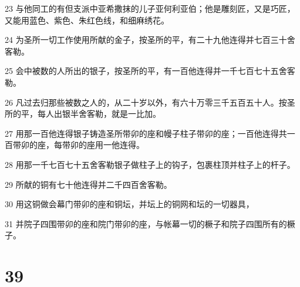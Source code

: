 \par 23 与他同工的有但支派中亚希撒抹的儿子亚何利亚伯；他是雕刻匠，又是巧匠，又能用蓝色、紫色、朱红色线，和细麻绣花。
\par 24 为圣所一切工作使用所献的金子，按圣所的平，有二十九他连得并七百三十舍客勒。
\par 25 会中被数的人所出的银子，按圣所的平，有一百他连得并一千七百七十五舍客勒。
\par 26 凡过去归那些被数之人的，从二十岁以外，有六十万零三千五百五十人。按圣所的平，每人出银半舍客勒，就是一比加。
\par 27 用那一百他连得银子铸造圣所带卯的座和幔子柱子带卯的座；一百他连得共一百带卯的座，每带卯的座用一他连得。
\par 28 用那一千七百七十五舍客勒银子做柱子上的钩子，包裹柱顶并柱子上的杆子。
\par 29 所献的铜有七十他连得并二千四百舍客勒。
\par 30 用这铜做会幕门带卯的座和铜坛，并坛上的铜网和坛的一切器具，
\par 31 并院子四围带卯的座和院门带卯的座，与帐幕一切的橛子和院子四围所有的橛子。

\chapter{39}

